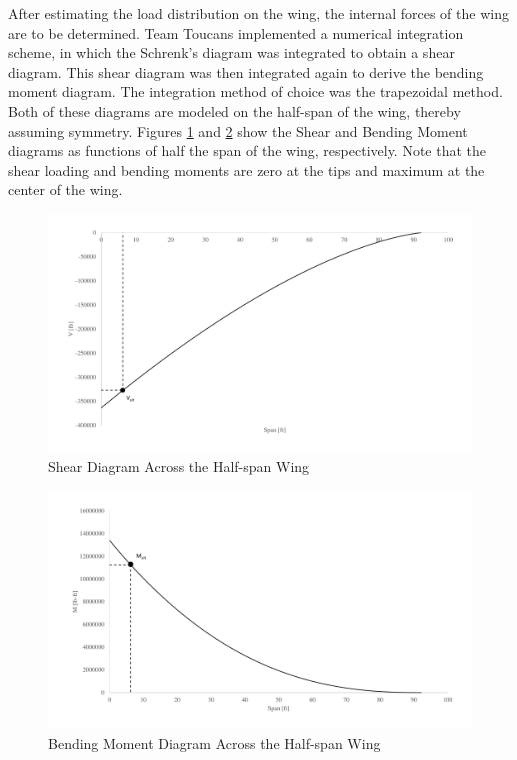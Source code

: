 After estimating the load distribution on the wing, the internal forces of the wing are to be determined. Team Toucans implemented a numerical integration scheme, in which the Schrenk's diagram was integrated to obtain a shear diagram. This shear diagram was then integrated again to derive the bending moment diagram. The integration method of choice was the trapezoidal method. Both of these diagrams are modeled on the half-span of the wing, thereby assuming symmetry. Figures \ref{sheardiag} and \ref{momentdiag} show the Shear and Bending Moment diagrams as functions of half the span of the wing, respectively. Note that the shear loading and bending moments are zero at the tips and maximum at the center of the wing. 

\begin{figure}[H]
    \centering
    \includegraphics[width=1.0\linewidth]{Photos/Shear.pdf}
    \caption{Shear Diagram Across the Half-span Wing}
    \label{sheardiag}
\end{figure}

\begin{figure}[H]
    \centering
    \includegraphics[width=1.0\linewidth]{Photos/Moment.pdf}
    \caption{Bending Moment Diagram Across the Half-span Wing}
    \label{momentdiag}
\end{figure}

